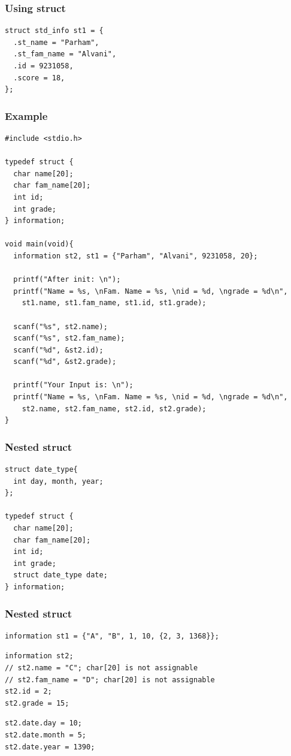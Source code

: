 \documentclass{../c-lecture}
\begin{document}
\begin{frame}[fragile]
  \frametitle{Using struct}
  \scriptsize
  \begin{verbatim}
struct std_info st1 = {
  .st_name = "Parham",
  .st_fam_name = "Alvani",
  .id = 9231058,
  .score = 18,
};
  \end{verbatim}
\end{frame}

\begin{frame}[fragile]
  \frametitle{Example}
  \tiny
  \begin{verbatim}
#include <stdio.h>

typedef struct {
  char name[20];
  char fam_name[20];
  int id;
  int grade;
} information;

void main(void){
  information st2, st1 = {"Parham", "Alvani", 9231058, 20};

  printf("After init: \n");
  printf("Name = %s, \nFam. Name = %s, \nid = %d, \ngrade = %d\n",
    st1.name, st1.fam_name, st1.id, st1.grade);

  scanf("%s", st2.name);
  scanf("%s", st2.fam_name);
  scanf("%d", &st2.id);
  scanf("%d", &st2.grade);

  printf("Your Input is: \n");
  printf("Name = %s, \nFam. Name = %s, \nid = %d, \ngrade = %d\n",
    st2.name, st2.fam_name, st2.id, st2.grade);
}
  \end{verbatim}
\end{frame}

\begin{frame}[fragile]
  \frametitle{Nested struct}
  \scriptsize
  \begin{verbatim}
struct date_type{
  int day, month, year;
};

typedef struct {
  char name[20];
  char fam_name[20];
  int id;
  int grade;
  struct date_type date;
} information;
  \end{verbatim}
\end{frame}

\begin{frame}[fragile]
  \frametitle{Nested struct}
  \begin{verbatim}
information st1 = {"A", "B", 1, 10, {2, 3, 1368}};
  \end{verbatim}
  \begin{verbatim}
information st2;
// st2.name = "C"; char[20] is not assignable
// st2.fam_name = "D"; char[20] is not assignable
st2.id = 2;
st2.grade = 15;
  \end{verbatim}
  \begin{verbatim}
st2.date.day = 10;
st2.date.month = 5;
st2.date.year = 1390;
  \end{verbatim}
\end{frame}
\end{document}
